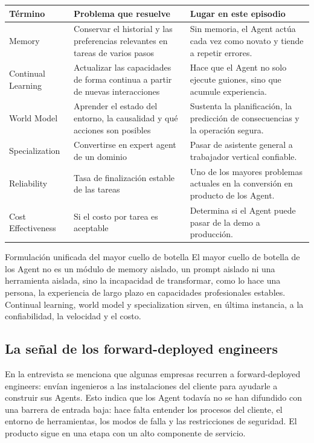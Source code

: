 \noindent\begin{tabularx}{\textwidth}{p{}p{}X}
\toprule
Término & Problema que resuelve & Lugar en este episodio \\
\midrule
Memory & Conservar el historial y las preferencias relevantes en tareas de varios pasos & Sin memoria, el Agent actúa cada vez como novato y tiende a repetir errores. \\
Continual Learning & Actualizar las capacidades de forma continua a partir de nuevas interacciones & Hace que el Agent no solo ejecute guiones, sino que acumule experiencia. \\
World Model & Aprender el estado del entorno, la causalidad y qué acciones son posibles & Sustenta la planificación, la predicción de consecuencias y la operación segura. \\
Specialization & Convertirse en expert agent de un dominio & Pasar de asistente general a trabajador vertical confiable. \\
Reliability & Tasa de finalización estable de las tareas & Uno de los mayores problemas actuales en la conversión en producto de los Agent. \\
Cost Effectiveness & Si el costo por tarea es aceptable & Determina si el Agent puede pasar de la demo a producción. \\
\bottomrule
\end{tabularx}

\begin{importantbox}{Formulación unificada del mayor cuello de botella}
El mayor cuello de botella de los Agent no es un módulo de memory aislado, un prompt aislado ni una herramienta aislada, sino la incapacidad de transformar, como lo hace una persona, la experiencia de largo plazo en capacidades profesionales estables. Continual learning, world model y specialization sirven, en última instancia, a la confiabilidad, la velocidad y el costo.
\end{importantbox}

\subsection{La señal de los forward-deployed engineers}

En la entrevista se menciona que algunas empresas recurren a forward-deployed engineers: envían ingenieros a las instalaciones del cliente para ayudarle a construir sus Agents. Esto indica que los Agent todavía no se han difundido con una barrera de entrada baja: hace falta entender los procesos del cliente, el entorno de herramientas, los modos de falla y las restricciones de seguridad. El producto sigue en una etapa con un alto componente de servicio.

